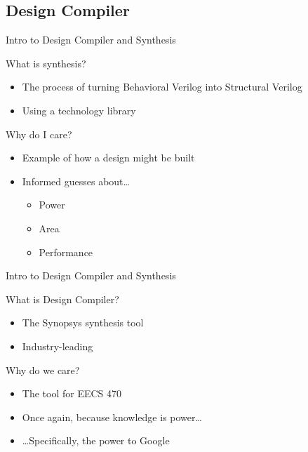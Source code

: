 \documentclass[dvipsnames]{beamer}
\begin{document}
\subsection{Design Compiler}
\begin{frame}{Intro to Design Compiler and Synthesis}
	\begin{block}{What is synthesis?}
		\begin{itemize}
			\item The process of turning Behavioral Verilog into Structural
				Verilog
			\item Using a technology library
		\end{itemize}
	\end{block}
	\begin{block}{Why do I care?}
		\begin{itemize}
			\item Example of how a design might be built
			\item Informed guesses about\dots 
				\begin{itemize}
					\item Power
					\item Area
					\item Performance
				\end{itemize}
		\end{itemize}
	\end{block}
\end{frame}

\begin{frame}{Intro to Design Compiler and Synthesis}
	\begin{block}{What is Design Compiler?}
		\begin{itemize}
			\item The Synopsys synthesis tool
			\item Industry-leading
		\end{itemize}
	\end{block}
	\begin{block}{Why do we care?}
		\begin{itemize}
			\item The tool for EECS 470
			\item Once again, because knowledge is power\dots
			\item \dots Specifically, the power to Google
		\end{itemize}
	\end{block}
\end{frame}
\end{document}
